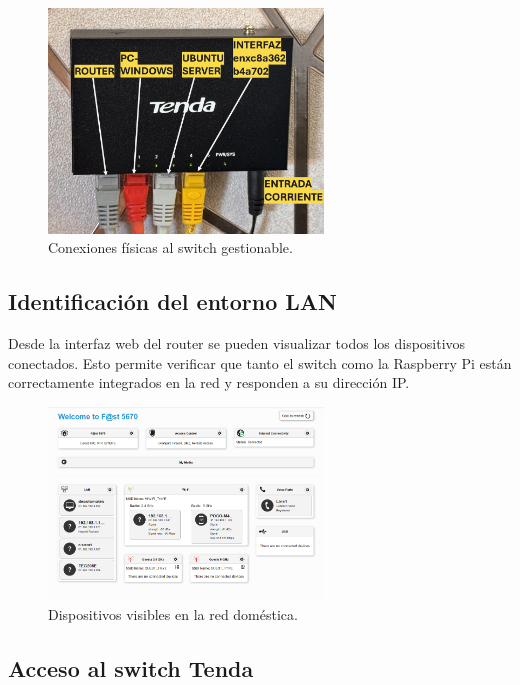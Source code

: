 \documentclass[12pt,a4paper]{report}
\begin{document}
\begin{figure}[H]
	\centering
	\includegraphics[width=0.65\textwidth]{pruebas_config/2-2.JPG}
	\caption{Conexiones físicas al switch gestionable.}
\end{figure}

\subsection*{Identificación del entorno LAN}

Desde la interfaz web del router se pueden visualizar todos los dispositivos conectados. Esto permite verificar que tanto el switch como la Raspberry Pi están correctamente integrados en la red y responden a su dirección IP.

\begin{figure}[H]
	\centering
	\includegraphics[width=0.65\textwidth]{pruebas_config/3-router.png}
	\caption{Dispositivos visibles en la red doméstica.}
\end{figure}

\subsection*{Acceso al switch Tenda}
\end{document}
